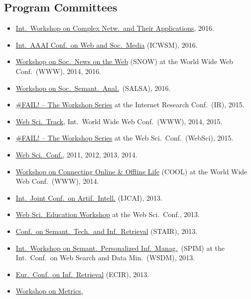 \documentclass[line,mm]{res}
\newcounter{x}
\newcounter{y}
\begin{document}
\begin{resume}
\section{Program Committees}
\begin{itemize}
\item \href{http://complexnetworks.org/index2016.html}{Int.\ Workshop on
  Complex Netw.\ and Their Applications}, 2016.  
\item \href{http://www.icwsm.org/2016/index.php}{Int.\ AAAI Conf.\ on
  Web and Soc.\ Media} (ICWSM), 2016.
\item \href{http://www.snow-workshop.org/}{Workshop on Soc.\ News on
  the Web} (SNOW) at the World Wide Web Conf.\ (WWW), 2014, 2016. 
\item \href{http://events.kmi.open.ac.uk/salsa2016/}{Workshop on Soc.\ Semant.\ Anal.}\ (SALSA), 2016.
\item \href{https://failworkshops.wordpress.com/fail-at-ir16/}{\#FAIL!
  -- The Workshop Series} at the Internet Research Conf.\ (IR), 2015.
\item \href{http://www.www2015.it/call-for-web-science-track/}{Web
  Sci.\ Track}, Int.\ World Wide Web Conf.\ (WWW), 2014, 2015.
\item \href{https://failworkshops.wordpress.com/fail-workshop-at-websci15/}{\#FAIL! -- The Workshop Series} at the Web Sci.\ Conf.\ (WebSci), 2015.
\item \href{http://www.websci14.org/}{Web Sci.\ Conf.},
  2011, 2012, 2013, 2014. 
\item \href{http://www.cool2014.com/}{Workshop on Connecting Online \&
  Offline Life} (COOL) at the World Wide Web Conf.\ (WWW), 2014. 
\item \href{http://ijcai13.org/}{Int.\ Joint Conf.\ on Artif.\ Intell.} (IJCAI), 2013.  
\item \href{http://webscience-education-workshop.blogs.usj.edu.lb/}{Web
  Sci.\ Education Workshop} at the Web Sci.\ Conf., 2013. 
\item \href{http://www.ftsm.ukm.my/stair13/}{Conf.\ on Semant.\ Tech.\ and Inf.\ Retrieval} (STAIR), 2013. 
\item \href{http://spim-workshop.org/}{Int.\ Workshop on Semant.\ Personalized Inf.\ Manag.}\ (SPIM) at the Int.\ Conf.\ on Web
  Search and Data Min.\ (WSDM), 2013.  
\item \href{http://ecir2013.org/}{Eur.\ Conf.\ on Inf.\ Retrieval} (ECIR), 2013.  
\item \href{http://mama.west.uni-koblenz.de/}{Workshop on Metrics,
}
\end{itemize}
\end{resume}
\end{document}
